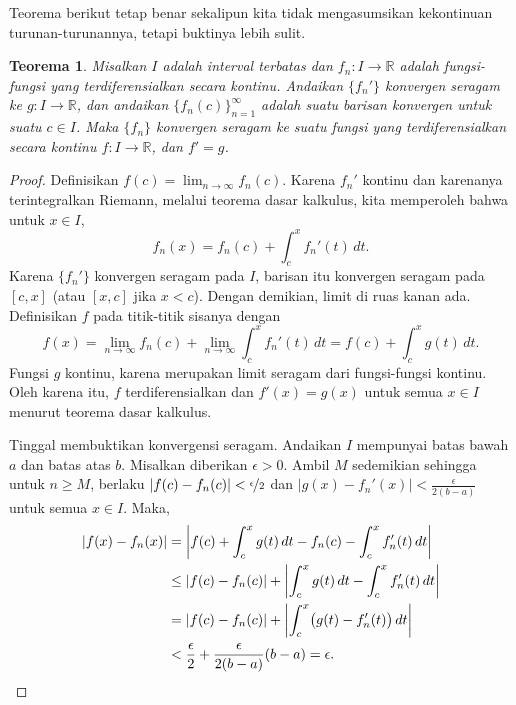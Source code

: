 \documentclass[12pt,openany]{book}
\newcommand{\abs}[1]{\left\lvert {#1} \right\rvert}
\newcommand{\R}{{\mathbb{R}}}
\theoremstyle{plain}
\newtheorem{thm}{Teorema}[section]
\theoremstyle{remark}
\theoremstyle{definition}
\theoremstyle{exercise}
\theoremstyle{example}
\begin{document}
Teorema berikut tetap benar sekalipun 
kita tidak mengasumsikan kekontinuan turunan-turunannya, tetapi buktinya lebih
sulit.

\begin{thm} \label{thm:dersconverge}
Misalkan $I$ adalah interval terbatas dan
$f_n \colon I \to \R$ adalah fungsi-fungsi yang terdiferensialkan secara kontinu.
Andaikan $\{ f_n' \}$ konvergen seragam ke $g \colon I \to \R$,
dan andaikan $\{ f_n(c) \}_{n=1}^\infty$ adalah suatu
barisan konvergen untuk suatu $c \in I$.  Maka $\{ f_n \}$ konvergen seragam ke 
suatu fungsi yang terdiferensialkan secara kontinu $f \colon I \to \R$, dan $f' = g$.
\end{thm}

\begin{proof}
Definisikan $f(c) = \lim_{n\to \infty} f_n(c)$.
Karena $f_n'$ kontinu dan karenanya terintegralkan Riemann,
melalui teorema dasar kalkulus, kita memperoleh bahwa untuk $x \in I$,
\begin{equation*}
f_n(x) = f_n(c) + \int_c^x f_n' (t)\, dt.
\end{equation*}
Karena $\{ f_n' \}$ konvergen seragam pada $I$, barisan itu konvergen seragam
pada $[c,x]$ (atau $[x,c]$ jika $x < c$).
Dengan demikian, limit di ruas kanan ada.
Definisikan $f$ pada titik-titik sisanya dengan
\begin{equation*}
f(x) =
\lim_{n\to\infty} f_n(c) + \lim_{n\to\infty} \int_c^x f_n' (t)\, dt
=
f(c) + \int_c^x g(t)\,dt .
\end{equation*}
Fungsi $g$ kontinu, karena merupakan limit seragam dari fungsi-fungsi
kontinu.  Oleh karena itu, $f$ terdiferensialkan dan $f'(x) = g(x)$ untuk semua $x \in I$
menurut teorema dasar kalkulus.

Tinggal membuktikan
konvergensi seragam.
Andaikan $I$ mempunyai batas bawah $a$ dan batas atas $b$.
Misalkan diberikan $\epsilon > 0$.  Ambil $M$
sedemikian sehingga untuk $n \geq M$, berlaku
$\abs{f(c)-f_n(c)} < \nicefrac{\epsilon}{2}$
dan
$\abs{g(x)-f_n'(x)} < \frac{\epsilon}{2(b-a)}$
untuk semua $x \in I$.  Maka,
\begin{equation*}
\begin{split}
\abs{f(x) - f_n(x)} & =
\abs{f(c) + \int_c^x g(t) \, dt - f_n(c) - \int_c^x f_n'(t)\,dt}
\\
& \leq
\abs{f(c) - f_n(c)} + \abs{\int_c^x g(t)\,dt - \int_c^x f_n'(t)\,dt}
\\
& =
\abs{f(c) - f_n(c)} + \abs{\int_c^x \bigl(g(t) - f_n'(t)\bigr) \, dt}
\\
& <
\frac{\epsilon}{2}
+
\frac{\epsilon}{2(b-a)}
(b-a)
=\epsilon. \qedhere
\end{split}
\end{equation*}
\end{proof}
\end{document}
